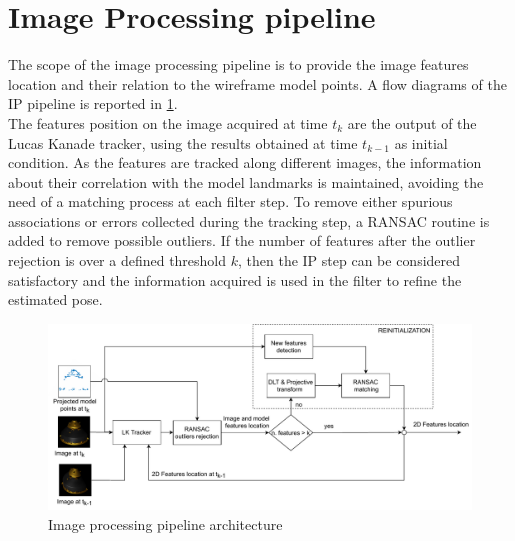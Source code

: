\section{Image Processing pipeline}
\label{sec:IP}
The scope of the image processing pipeline is to provide the image features location and their relation to the wireframe model points. A flow diagrams of the IP pipeline is reported in \cref{fig:IP}. \\
The features position on the image acquired at time $t_k$ are the output of the Lucas Kanade tracker, using the results obtained at time $t_{k-1}$ as initial condition. 
As the features are tracked along different images, the information about their correlation with the model landmarks is maintained, avoiding the need of a matching process at each filter step.  
To remove either spurious associations or errors collected during the tracking step, a RANSAC routine is added to remove possible outliers. If the number of features after the outlier rejection is over a defined threshold $k$, then the IP step can be considered satisfactory and the information acquired is used in the filter to refine the estimated pose. \\
\begin{figure}[!h]
    \centering
    \includegraphics[width = \linewidth]{Images/IPstep.pdf}
    \caption{Image processing pipeline architecture}
    \label{fig:IP}
\end{figure}

